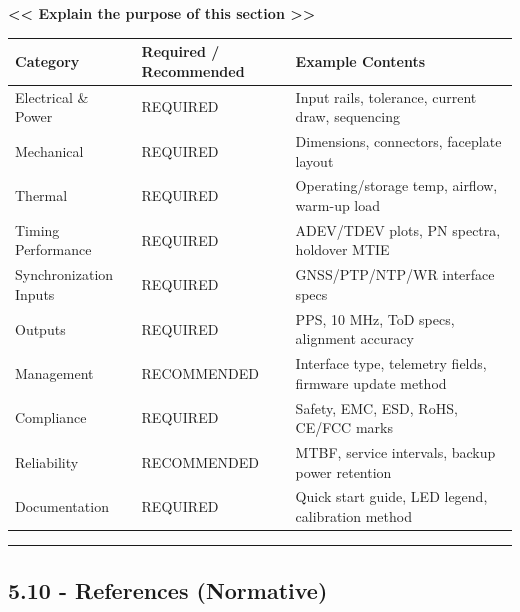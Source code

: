 \documentclass[
]{article}
\newcounter{none} %
\begin{document}
\textbf{\textless\textless{} Explain the purpose of this section
\textgreater\textgreater{}}

{\def\LTcaptype{none} %
\begin{longtable}[]{@{}
  >{\raggedright\arraybackslash}p{}
  >{\raggedright\arraybackslash}p{}
  >{\raggedright\arraybackslash}p{}@{}}
\toprule\noalign{}
Category & Required / Recommended & Example Contents \\
\midrule\noalign{}
\endhead
\bottomrule\noalign{}
\endlastfoot
Electrical \& Power & REQUIRED & Input rails, tolerance, current draw,
sequencing \\
Mechanical & REQUIRED & Dimensions, connectors, faceplate layout \\
Thermal & REQUIRED & Operating/storage temp, airflow, warm-up load \\
Timing Performance & REQUIRED & ADEV/TDEV plots, PN spectra, holdover
MTIE \\
Synchronization Inputs & REQUIRED & GNSS/PTP/NTP/WR interface specs \\
Outputs & REQUIRED & PPS, 10 MHz, ToD specs, alignment accuracy \\
Management & RECOMMENDED & Interface type, telemetry fields, firmware
update method \\
Compliance & REQUIRED & Safety, EMC, ESD, RoHS, CE/FCC marks \\
Reliability & RECOMMENDED & MTBF, service intervals, backup power
retention \\
Documentation & REQUIRED & Quick start guide, LED legend, calibration
method \\
\end{longtable}
}

\begin{center}\rule{0.5\linewidth}{0.5pt}\end{center}

\subsection{5.10 - References (Normative)}\label{references-normative}
\end{document}

